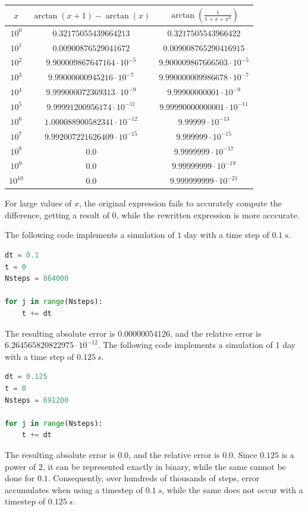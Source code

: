\documentclass{article}
\begin{document}
\begin{center}
    \begin{tabular}{|c|c|c|}
        \hline
        $x$ & $\arctan(x + 1) - \arctan(x)$ & $\arctan\left(\frac{1}{1 + x + x^2}\right)$ \\
        \hline
        $10^0$ & $0.32175055439664213$ & $0.3217505543966422$ \\
        \hline
        $10^1$ & $0.00900876529041672$ & $0.009008765290416915$ \\
        \hline
        $10^2$ & $9.900009867647164 \cdot 10^{-5}$ & $9.900009867666503 \cdot 10^{-5}$ \\
        \hline
        $10^3$ & $9.99000000945216 \cdot 10^{-7}$ & $9.990000009986678 \cdot 10^{-7}$ \\
        \hline
        $10^4$ & $9.999000072369313 \cdot 10^{-9}$ & $9.99900000001 \cdot 10^{-9}$ \\
        \hline
        $10^5$ & $9.99991200956174 \cdot 10^{-11}$ & $9.99990000000001 \cdot 10^{-11}$ \\
        \hline
        $10^6$ & $1.000088900582341 \cdot 10^{-12}$ & $9.99999 \cdot 10^{-13}$ \\
        \hline
        $10^7$ & $9.992007221626409 \cdot 10^{-15}$ & $9.999999 \cdot 10^{-15}$ \\
        \hline
        $10^8$ & $0.0$ & $9.9999999 \cdot 10^{-17}$ \\
        \hline
        $10^9$ & $0.0$ & $9.99999999 \cdot 10^{-19}$ \\
        \hline
        $10^10$ & $0.0$ & $9.999999999 \cdot 10^{-21}$ \\
        \hline
    \end{tabular}
\end{center}
For large values of $x$, the original expression fails to accurately compute the difference, getting a result of $0$, while the rewritten expression is more acccurate.

\clearpage

\problem{}
The following code implements a simulation of $1$ day with a time step of $0.1~\unit{s}$.
\begin{lstlisting}[language=Python]
dt = 0.1
t = 0
Nsteps = 864000

for j in range(Nsteps):
    t += dt
\end{lstlisting}
The resulting absolute error is $0.00000054126$, and the relative error is $6.264565820822975 \cdot 10^{-12}$.
The following code implements a simulation of $1$ day with a time step of $0.125~\unit{s}$.
\begin{lstlisting}[language=Python]
dt = 0.125
t = 0
Nsteps = 691200

for j in range(Nsteps):
    t += dt
\end{lstlisting}
The resulting absolute error is $0.0$, and the relative error is $0.0$.
Since $0.125$ is a power of $2$, it can be represented exactly in binary, while the same cannot be done for $0.1$. Consequently, over hundreds of thousands of steps, error accumulates when using a timestep of $0.1~\unit{s}$, while the same does not occur with a timestep of $0.125~\unit{s}$.
\end{document}
